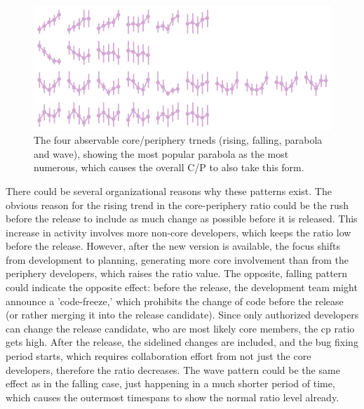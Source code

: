 \begin{figure}[!htbp]
    \centering
    \includegraphics[width=\textwidth]{figures/quantitative/pointplots/cp_ratio_trends.png}
    \caption{The four abservable core/periphery trneds (rising, falling, parabola and wave), showing the most popular parabola as the most numerous, which causes the overall C/P to also take this form.}
    \label{fig:cp-box-grid}
\end{figure}


There could be several organizational reasons why these patterns exist. The obvious reason for the rising trend in the core-periphery ratio could be the rush before the release to include as much change as possible before it is released. This increase in activity involves more non-core developers, which keeps the ratio low before the release. However, after the new version is available, the focus shifts from development to planning, generating more core involvement than from the periphery developers, which raises the ratio value. The opposite, falling pattern could indicate the opposite effect: before the release, the development team might announce a 'code-freeze,' which prohibits the change of code before the release (or rather merging it into the release candidate). Since only authorized developers can change the release candidate, who are most likely core members, the cp ratio gets high. After the release, the sidelined changes are included, and the bug fixing period starts, which requires collaboration effort from not just the core developers, therefore the ratio decreases. The wave pattern could be the same effect as in the falling case, just happening in a much shorter period of time, which causes the outermost timespans to show the normal ratio level already. \\

